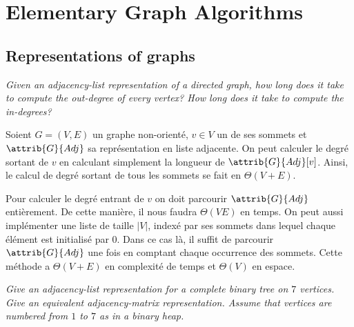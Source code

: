 \section{Elementary Graph Algorithms}

\subsection{Representations of graphs}

\begin{description}

 \textit{Given an adjacency-list representation of a directed graph, how long does it take to compute the out-degree of every vertex? How long does it take to compute the in-degrees?}    

\begin{ex}
Soient $G = (V,E)$ un graphe non-orienté, $v \in V$ un de ses sommets et $\attrib{G}{Adj}$ sa représentation en liste adjacente. On peut calculer le degré sortant de $v$ en calculant simplement la longueur de $\attrib{G}{Adj}[v]$. Ainsi, le calcul de degré sortant de tous les sommets se fait en $\Theta(V + E)$.

Pour calculer le degré entrant de $v$ on doit parcourir $\attrib{G}{Adj}$ entièrement. De cette manière, il nous faudra $\Theta(VE)$ en temps. On peut aussi implémenter une liste de taille $|V|$, indexé par ses sommets dans lequel chaque élément est initialisé par 0. Dans ce cas là, il suffit de parcourir $\attrib{G}{Adj}$ une fois en comptant chaque occurrence des sommets. Cette méthode a $\Theta(V + E)$ en complexité de temps et $\Theta(V)$ en espace.
\end{ex}


 \textit{Give an adjacency-list representation for a complete binary tree on $7$ vertices. Give an equivalent adjacency-matrix representation. Assume that vertices are numbered from $1$ to $7$ as in a binary heap.}    


\end{description}
